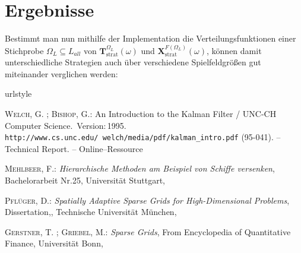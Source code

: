 \documentclass[a4paper,12pt]{llncs}
\numberwithin{equation}{section}
\DeclareMathOperator{\strat}{strat}
\begin{document}
\section{Ergebnisse}

Bestimmt man nun mithilfe der Implementation die Verteilungsfunktionen einer Stichprobe $\Omega_L \subseteq L_{all}$ von $\mathbf{T}^{\Omega_L}_{\strat}(\omega)$ und $\mathbf{X}^{F(\Omega_L)}_{\strat}(\omega)$, können damit unterschiedliche Strategien auch über verschiedene Spielfeldgrößen gut miteinander verglichen werden:

\newpage

% 

\begin{thebibliography}{WB95}
	\providecommand{\url}[1]{\texttt{#1}}
	\expandafter\ifx\csname urlstyle\endcsname\relax
	\providecommand{\doi}[1]{doi: #1}\else
	\providecommand{\doi}{doi: \begingroup \urlstyle{rm}\Url}\fi
	
	\textsc{Welch}, G. ; \textsc{Bishop}, G.:
	\newblock An Introduction to the Kalman Filter  / UNC-CH Computer Science.
	\newblock \,Version:\,1995.
	\newblock  \url{http://www.cs.unc.edu/~welch/media/pdf/kalman_intro.pdf}
	(95-041). --
	\newblock Technical Report. --
	\newblock Online--Ressource
	
	\textsc{Mehlbeer}, F.:
	\newblock \textit{Hierarchische Methoden am Beispiel von Schiffe versenken},
	\newblock Bachelorarbeit Nr.25,
	\newblock Universität Stuttgart,
	
	\textsc{Pflüger}, D.:
	\newblock \textit{Spatially Adaptive Sparse Grids for High-Dimensional Problems},
	\newblock Dissertation,,
	\newblock Technische Universität München,
	
	\textsc{Gerstner}, T. ; \textsc{Griebel}, M.:
	\newblock \textit{Sparse Grids},
	\newblock From Encyclopedia of Quantitative Finance,
	\newblock Universität Bonn,
	
\end{thebibliography}


\end{document}
